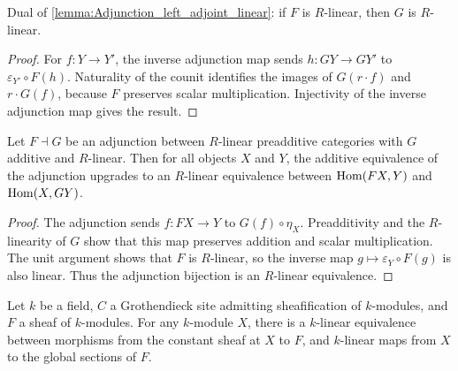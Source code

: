 \begin{lemma}\leanok
  \label{lemma:Adjunction_right_adjoint_linear}
  Dual of \cref{lemma:Adjunction_left_adjoint_linear}: if \(F\) is \(R\)-linear, then \(G\) is \(R\)-linear.
\end{lemma}

\begin{proof}
  \leanok
  For \(f:Y\to Y'\), the inverse adjunction map sends \(h:GY\to GY'\) to \(\varepsilon_{Y'}\circ F(h)\). Naturality of the counit identifies the images of \(G(r\cdot f)\) and \(r\cdot G(f)\), because \(F\) preserves scalar multiplication. Injectivity of the inverse adjunction map gives the result.
\end{proof}

\begin{theorem}\leanok
  \label{def:Adjunction_homLinearEquiv}
  
  Let \(F \dashv G\) be an adjunction between \(R\)-linear preadditive categories with \(G\) additive and \(R\)-linear. Then for all objects \(X\) and \(Y\), the additive equivalence of the adjunction upgrades to an \(R\)-linear equivalence between \(\operatorname{Hom}(FX, Y)\) and \(\operatorname{Hom}(X, GY)\).
\end{theorem}

\begin{proof}
  \leanok
  The adjunction sends \(f:FX\to Y\) to \(G(f)\circ\eta_X\). Preadditivity and the \(R\)-linearity of \(G\) show that this map preserves addition and scalar multiplication. The unit argument shows that \(F\) is \(R\)-linear, so the inverse map \(g\mapsto\varepsilon_Y\circ F(g)\) is also linear. Thus the adjunction bijection is an \(R\)-linear equivalence.
\end{proof}

\begin{theorem}\leanok
  \label{def:Scheme_constantSheafGammaHom_linearEquiv}
  Let \(k\) be a field, \(C\) a Grothendieck site admitting sheafification of \(k\)-modules, and \(F\) a sheaf of \(k\)-modules. For any \(k\)-module \(X\), there is a \(k\)-linear equivalence between morphisms from the constant sheaf at \(X\) to \(F\), and \(k\)-linear maps from \(X\) to the global sections of \(F\).
\end{theorem}

